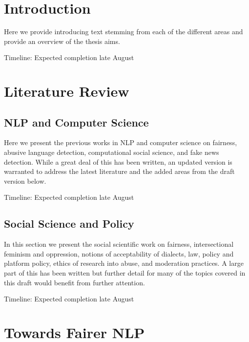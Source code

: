 {\color{red}
\section{Introduction}

Here we provide introducing text stemming from each of the different areas and provide an overview of the thesis aims.

Timeline: Expected completion late August
\section{Literature Review}

\subsection{NLP and Computer Science}

Here we present the previous works in NLP and computer science on fairness, abusive language detection, computational social science, and fake news detection. While a great deal of this has been written, an updated version is warranted to address the latest literature and the added areas from the draft version below. 

Timeline: Expected completion late August
\subsection{Social Science and Policy}
In this section we present the social scientific work on fairness, intersectional feminism and oppression, notions of acceptability of dialects, law, policy and platform policy, ethics of research into abuse, and moderation practices. A large part of this has been written but further detail for many of the topics covered in this draft would benefit from further attention.

Timeline: Expected completion late August

\section{Towards Fairer NLP}

}
